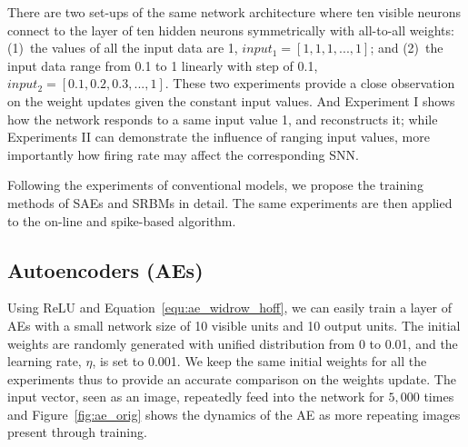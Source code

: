 There are two set-ups of the same network architecture where ten visible neurons connect to the layer of ten hidden neurons symmetrically with all-to-all weights: (1)~the values of all the input data are 1, $input_1 = [1, 1, 1,...,1]$; and (2)~the input data range from 0.1 to 1 linearly with step of 0.1, $input_2 = [0.1, 0.2, 0.3,...,1]$.
These two experiments provide a close observation on the weight updates given the constant input values.
And Experiment I shows how the network responds to a same input value 1, and reconstructs it; while Experiments II can demonstrate the influence of ranging input values, more importantly how firing rate may affect the corresponding SNN.

Following the experiments of conventional models, we propose the training methods of SAEs and SRBMs in detail.
The same experiments are then applied to the on-line and spike-based algorithm.

\subsection{Autoencoders (AEs)}
Using ReLU and Equation~\ref{equ:ae_widrow_hoff}, we can easily train a layer of AEs with a small network size of 10 visible units and 10 output units.
The initial weights are randomly generated with unified distribution from 0 to 0.01, and the learning rate, $\eta$, is set to 0.001.
We keep the same initial weights for all the experiments thus to provide an accurate comparison on the weights update.
The input vector, seen as an image, repeatedly feed into the network for $5,000$ times and Figure~\ref{fig:ae_orig} shows the dynamics of the AE as more repeating images present through training.

